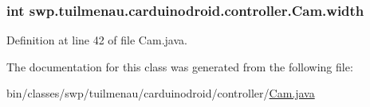 \subsubsection[{width}]{\setlength{\rightskip}{0pt plus 5cm}int swp.\+tuilmenau.\+carduinodroid.\+controller.\+Cam.\+width}\label{classswp_1_1tuilmenau_1_1carduinodroid_1_1controller_1_1_cam_ac546b52ac9a2eb30e64c9ddd28872cdc}


Definition at line 42 of file Cam.\+java.



The documentation for this class was generated from the following file\+:\begin{DoxyCompactItemize}
\item 
bin/classes/swp/tuilmenau/carduinodroid/controller/\hyperlink{bin_2classes_2swp_2tuilmenau_2carduinodroid_2controller_2_cam_8java}{Cam.\+java}\end{DoxyCompactItemize}
